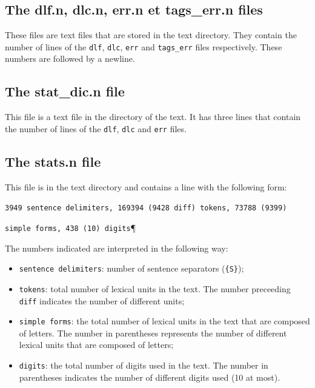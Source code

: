 \subsection{The dlf.n, dlc.n, err.n et tags\_err.n files}
These files are text files that are stored in the text directory. They
contain the number of lines of the \verb+dlf+, \verb+dlc+, \verb+err+ and \verb+tags_err+ files
respectively. These numbers are followed by a newline.


\subsection{The stat\_dic.n file}
This file is a text file in the directory of the text. It has three lines that
contain the number of lines of the \verb+dlf+, \verb+dlc+ and \verb+err+ files.

\subsection{The stats.n file}
This file is in the text directory and contains a line with the following form:


\bigskip
\verb$3949 sentence delimiters, 169394 (9428 diff) tokens, 73788 (9399)$

\verb$simple forms, 438 (10) digits$\P

\bigskip
\noindent The numbers indicated are interpreted in the following way:
\begin{itemize}
  \item \verb+sentence delimiters+: number of sentence separators
  (\verb+{S}+);

  \item \verb+tokens+: total number of lexical units in the text. The number
  preceeding \verb+diff+ indicates the number of different units;

  \item \verb+simple forms+: the total number of lexical units in the text that
  are composed of letters. The number in parentheses represents the number of
  different lexical units that are composed of letters;

  \item \verb+digits+: the total number of digits used in the text. The number in
  parentheses indicates the number of different digits used (10 at most).

\end{itemize}


